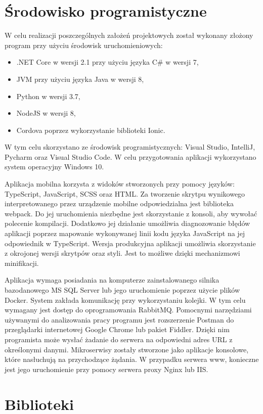 \section{Środowisko programistyczne}
W celu realizacji poszczególnych założeń projektowych został wykonany złożony program przy użyciu środowisk uruchomieniowych: 
\begin{itemize}[noitemsep]
	\item .NET Core w wersji 2.1 przy użyciu języka C\# w wersji 7,
	\item JVM przy użyciu języka Java w wersji 8,
	\item Python w wersji 3.7,
	\item NodeJS w wersji 8,
	\item Cordova poprzez wykorzystanie biblioteki Ionic.
\end{itemize}
W tym celu skorzystano ze środowisk programistycznych: Visual Studio, IntelliJ, Pycharm oraz Visual Studio Code. W celu przygotowania aplikacji wykorzystano system operacyjny Windows 10.

Aplikacja mobilna korzysta z widoków stworzonych przy pomocy języków: TypeScript, JavaScript, SCSS oraz HTML. Za tworzenie skrytpu wynikowego interpretowanego przez urządzenie mobilne odpowiedzialna jest biblioteka webpack. Do jej uruchomienia niezbędne jest skorzystanie z konsoli, aby wywołać polecenie kompilacji. Dodatkowo jej działanie umożliwia diagnozowanie błędów aplikacji poprzez mapowanie wykonywanej linii kodu języka JavaScript na jej odpowiednik w TypeScript. Wersja produkcyjna aplikacji umożliwia skorzystanie z okrojonej wersji skrytpów oraz styli. Jest to możliwe dzięki mechanizmowi minifikacji.

Aplikacja wymaga posiadania na komputerze zainstalowanego silnika bazodanowego MS SQL Server lub jego uruchomienie poprzez użycie plików Docker. System zakłada komunikację przy wykorzystaniu kolejki. W tym celu wymagany jest dostęp do oprogramowania RabbitMQ. Pomocnymi narzędziami używanymi do analizowania pracy programu jest rozszerzenie Postman\cite{Postman} do przeglądarki internetowej Google Chrome lub pakiet Fiddler\cite{Fiddler}. Dzięki nim programista może wysłać żadanie do serwera na odpowiedni adres URL z określonymi danymi. Mikroserwisy zostały stworzone jako aplikacje konsolowe, które nasłuchują na przychodzące żądania. W przypadku serwera www, konieczne jest jego uruchomienie przy pomocy serwera proxy Nginx lub IIS.


\section{Biblioteki}

